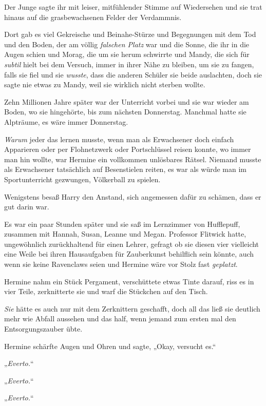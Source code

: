 {Der Junge sagte ihr mit leiser, mitfühlender Stimme auf Wiedersehen und sie trat hinaus auf die grasbewachsenen Felder der Verdammnis.

Dort gab es viel Gekreische und Beinahe-Stürze und Begegnungen mit dem Tod und den Boden, der am völlig \emph{falschen Platz} war und die Sonne, die ihr in die Augen schien und Morag, die um sie herum schwirrte und Mandy, die sich für \emph{subtil} hielt bei dem Versuch, immer in ihrer Nähe zu bleiben, um sie zu fangen, falls sie fiel und sie \emph{wusste}, dass die anderen Schüler sie beide auslachten, doch sie sagte nie etwas zu Mandy, weil sie wirklich nicht sterben wollte.

Zehn Millionen Jahre später war der Unterricht vorbei und sie war wieder am Boden, wo sie hingehörte, bis zum nächsten Donnerstag. Manchmal hatte sie Alpträume, es wäre immer Donnerstag.

\emph{Warum} jeder das lernen musste, wenn man als Erwachsener doch einfach Apparieren oder per Flohnetzwerk oder Portschlüssel reisen konnte, wo immer man hin wollte, war Hermine ein vollkommen unlösbares Rätsel. Niemand musste als Erwachsener tatsächlich auf Besenstielen reiten, es war als würde man im Sportunterricht gezwungen, Völkerball zu spielen.

Wenigstens besaß Harry den Anstand, sich angemessen dafür zu schämen, dass er gut darin war.

\later

Es war ein paar Stunden später und sie saß im Lernzimmer von Hufflepuff, zusammen mit Hannah, Susan, Leanne und Megan. Professor Flitwick hatte, ungewöhnlich zurückhaltend für einen Lehrer, gefragt ob sie diesen vier vielleicht eine Weile bei ihren Hausaufgaben für Zauberkunst behilflich sein könnte, auch wenn sie keine Ravenclaws seien und Hermine wäre vor Stolz fast \emph{geplatzt}.

Hermine nahm ein Stück Pergament, verschüttete etwas Tinte darauf, riss es in vier Teile, zerknitterte sie und warf die Stückchen auf den Tisch.

\emph{Sie} hätte es auch nur mit dem Zerknittern geschafft, doch all das ließ sie deutlich mehr wie Abfall aussehen und das half, wenn jemand zum ersten mal den Entsorgungszauber übte.

Hermine schärfte Augen und Ohren und sagte, „Okay, versucht es.“

„\emph{Everto.}“

„\emph{Everto.}“

„\emph{Everto.}“

}
